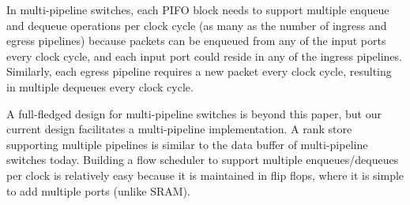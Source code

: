 In multi-pipeline switches, each PIFO block needs to support multiple enqueue
and dequeue operations per clock cycle (as many as the number of ingress and
egress pipelines) because packets can be enqueued from any of the input ports
every clock cycle, and each input port could reside in any of the ingress
pipelines. Similarly, each egress pipeline requires a new packet every clock
cycle, resulting in multiple dequeues every clock cycle.

A full-fledged design for multi-pipeline switches is beyond this paper, but our
current design facilitates a multi-pipeline implementation. A rank store
supporting multiple pipelines is similar to the data buffer of multi-pipeline
switches today. Building a flow scheduler to support multiple enqueues/dequeues
per clock is relatively easy because it is maintained in flip flops, where it
is simple to add multiple ports (unlike SRAM).
